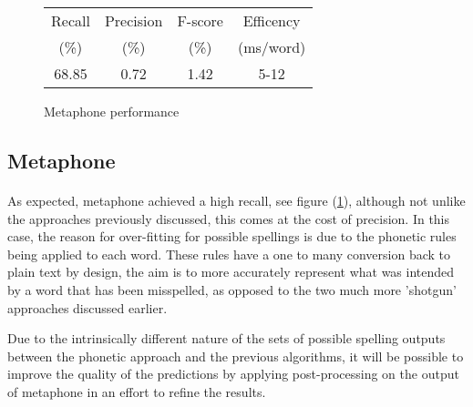 \documentclass[twocolumn]{article}
\begin{document}


\FloatBarrier


            \begin{figure}[h]
                \begin{center}
                    \begin{tabular}{|c|c|c|c|}
                        \hline
                        Recall & Precision & F-score & Efficency\\
                        (\%) & (\%) & (\%) & (ms/word)\\
                                        \hline\hline
                        68.85 & 0.72 & 1.42 & 5-12\\
                        \hline
                    \end{tabular}
                \end{center}
                \caption{Metaphone performance}
                \label{meta}
            \end{figure}

        \subsection{Metaphone}
\paragraph{}
    As expected, metaphone achieved a high recall, see figure (\ref{meta}), although not unlike the approaches previously
    discussed, this comes at the cost of precision.
    In this case, the reason for over-fitting for possible spellings is due to the phonetic rules being applied to each
    word.
    These rules have a one to many conversion back to plain text by design, the aim is to more accurately represent what
    was intended by a word that has been misspelled, as opposed to the two much more 'shotgun' approaches discussed earlier.

    Due to the intrinsically different nature of the sets of possible spelling outputs between the phonetic approach and
    the previous algorithms, it will be possible to improve the quality of the predictions by applying post-processing on
    the output of metaphone in an effort to refine the results.
\end{document}
